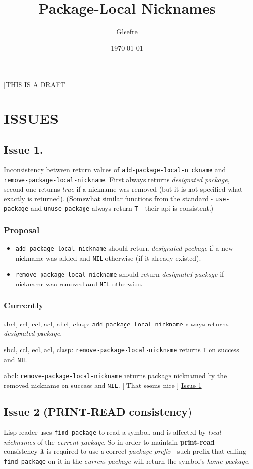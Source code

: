 \documentclass[11pt]{article}
\author{Gleefre}
\date{\today}
\title{Package-Local Nicknames}
\begin{document}
\maketitle
\tableofcontents

[THIS IS A DRAFT]

\section{ISSUES}
\label{sec:org24267f4}

\subsection{Issue 1.}
\label{sec:orgd93e701}
Inconsistency between return values of \texttt{add-package-local-nickname} and
\texttt{remove-package-local-nickname}. First always returns \emph{designated package},
second one returns \emph{true} if a nickname was removed (but it is not specified
what exactly is returned). (Somewhat similar functions from the standard -
\texttt{use-package} and \texttt{unuse-package} always return \texttt{T} - their api is
consistent.)
\subsubsection{Proposal}
\label{sec:org8e2e59b}
\begin{itemize}
\item \texttt{add-package-local-nickname} should return \emph{designated package} if a new
nickname was added and \texttt{NIL} otherwise (if it already existed).
\item \texttt{remove-package-local-nickname} should return \emph{designated package} if
nickname was removed and \texttt{NIL} otherwise.
\end{itemize}
\subsubsection{Currently}
\label{sec:org08106e6}
sbcl, ccl, ecl, acl, abcl, clasp: \texttt{add-package-local-nickname} always returns
\emph{designated package}.

sbcl, ccl, ecl, acl, clasp: \texttt{remove-package-local-nickname} returns \texttt{T} on
success and \texttt{NIL}

 abcl: \texttt{remove-package-local-nickname} returns package nicknamed by the
 removed nickname on success and \texttt{NIL}.  [ That seems nice ]
\href{./issues/1.org}{Issue 1}

\subsection{Issue 2 (PRINT-READ consistency)}
\label{sec:orgd7be5a4}
Lisp reader uses \texttt{find-package} to read a symbol, and is affected by \emph{local
nicknames} of the \emph{current package}. So in order to maintain \textbf{print-read}
consistency it is required to use a correct \emph{package prefix} - such prefix
that calling \texttt{find-package} on it in the \emph{current package} will return the
symbol's \emph{home package}.
\end{document}
